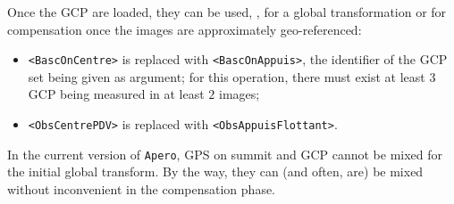 Once the GCP are loaded, they can be used, , for a global transformation
or  for compensation once the images are approximately geo-referenced:

\begin{itemize}
   \item {\tt  <BascOnCentre>} is replaced with {\tt <BascOnAppuis>}, the identifier of
          the GCP set being given as argument; for this operation, there must exist at least
          $3$ GCP being measured in at least $2$ images;


   \item {\tt <ObsCentrePDV>} is replaced with {\tt  <ObsAppuisFlottant>}.
\end{itemize}


In the current version of {\tt Apero}, GPS on summit and GCP cannot be mixed for the
initial global transform. By the way, they can (and often, are) be mixed without
inconvenient in the compensation phase.









